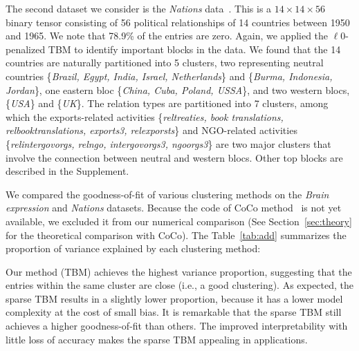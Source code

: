 \documentclass{article}
\begin{document}
The second dataset we consider is the \emph{Nations} data~\cite{nickel2011three}. This is a $14\times 14 \times 56$ binary tensor consisting of 56 political relationships of 14 countries between 1950 and 1965. We note that 78.9\% of the entries are zero. Again, we applied the $\ell0$-penalized TBM to identify important blocks in the data. 
We found that the 14 countries are naturally partitioned into 5 clusters, two representing neutral countries \{\emph{Brazil, Egypt, India, Israel, Netherlands}\} and \{\emph{Burma, Indonesia, Jordan}\}, one eastern bloc \{\emph{China, Cuba, Poland, USSA}\}, and two western blocs, \{\emph{USA}\} and \{\emph{UK}\}. The relation types are partitioned into 7 clusters, among which the exports-related activities \{\emph{reltreaties, book translations, relbooktranslations, exports3, relexporsts}\} and NGO-related activities \{\emph{relintergovorgs, relngo, intergovorgs3, ngoorgs3}\} are two major clusters that involve the connection between neutral and western blocs. Other top blocks are described in the Supplement. 

We compared the goodness-of-fit of various clustering methods on the \emph{Brain expression} and \emph{Nations} datasets. Because the code of CoCo method~\cite{chi2018provable} is not yet available, we excluded it from our numerical comparison (See Section~\ref{sec:theory} for the theoretical comparison with CoCo). The Table~\ref{tab:add} summarizes the proportion of variance explained by each clustering method:

\begin{table}[H]
\centering
\caption{Comparison of goodness-of-fit in the \emph{Brain} expression and \emph{Nations} datasets.}\label{tab:add}
\end{table}

\vspace{-.7cm}
Our method (TBM) achieves the highest variance proportion, suggesting that the entries within the same cluster are close (i.e., a good clustering). As expected, the sparse TBM results in a slightly lower proportion, because it has a lower model complexity at the cost of small bias. It is remarkable that the sparse TBM still achieves a higher goodness-of-fit than others. The improved interpretability with little loss of accuracy makes the sparse TBM appealing in applications. 
\end{document}
